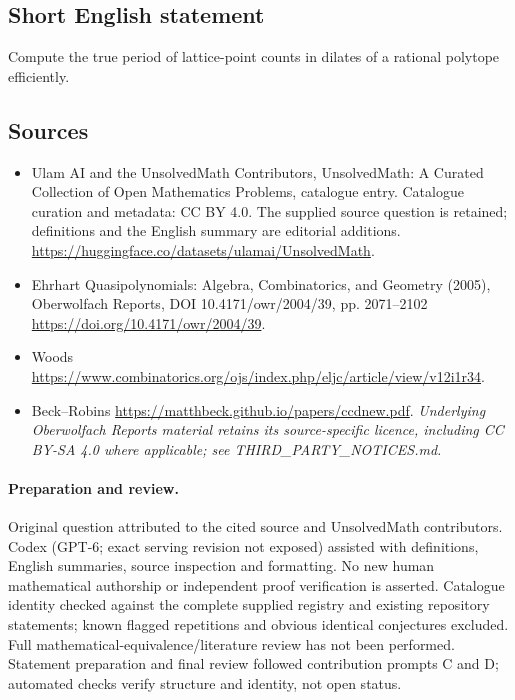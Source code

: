 \documentclass[11pt]{article}
\begin{document}
\subsection{Short English statement}
Compute the true period of lattice-point counts in dilates of a rational polytope efficiently.
\subsection{Sources}
\begin{itemize}
\item[\hypertarget{source:statement:1}{S1}] Ulam AI and the UnsolvedMath Contributors, UnsolvedMath: A Curated Collection of Open Mathematics Problems, catalogue entry. Catalogue curation and metadata: CC BY 4.0. The supplied source question is retained; definitions and the English summary are editorial additions.
\url{https://huggingface.co/datasets/ulamai/UnsolvedMath}.
\item[\hypertarget{source:statement:2}{S2}] Ehrhart Quasipolynomials: Algebra, Combinatorics, and Geometry (2005), Oberwolfach Reports, DOI 10.4171/owr/2004/39, pp. 2071--2102
\url{https://doi.org/10.4171/owr/2004/39}.
\item[\hypertarget{source:statement:3}{S3}] Woods
\url{https://www.combinatorics.org/ojs/index.php/eljc/article/view/v12i1r34}.
\item[\hypertarget{source:statement:4}{S4}] Beck--Robins
\url{https://matthbeck.github.io/papers/ccdnew.pdf}.
\textit{Underlying Oberwolfach Reports material retains its source-specific licence, including CC BY-SA 4.0 where applicable; see THIRD\_PARTY\_NOTICES.md.}
\end{itemize}
\paragraph{Preparation and review.}
Original question attributed to the cited source and UnsolvedMath contributors. Codex (GPT-6; exact serving revision not exposed) assisted with definitions, English summaries, source inspection and formatting. No new human mathematical authorship or independent proof verification is asserted. Catalogue identity checked against the complete supplied registry and existing repository statements; known flagged repetitions and obvious identical conjectures excluded. Full mathematical-equivalence/literature review has not been performed. Statement preparation and final review followed contribution prompts C and D; automated checks verify structure and identity, not open status.
\label{end:statement}
\end{document}
